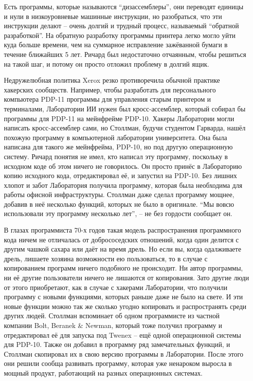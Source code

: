 Есть программы, которые называются ``дизассемблеры'', они переводят единицы и нули в низкоуровневые машинные инструкции, но разобраться, что эти инструкции делают -- очень долгий и трудный процесс, называемый ``обратной разработкой''. На обратную разработку программы принтера легко могло уйти куда больше времени, чем на суммарное исправление зажёванной бумаги в течение ближайших 5 лет. Ричард был недостаточно отчаянным, чтобы решиться на такой шаг, и потому он просто отложил проблему в долгий ящик.

Недружелюбная политика Xerox резко противоречила обычной практике хакерских сообществ. Например, чтобы разработать для персонального компьютера PDP-11 программы для управления старым принтером и терминалами, Лаборатории ИИ нужен был кросс-ассемблер, который собирал бы программы для PDP-11 на мейнфрейме PDP-10. Хакеры Лаборатории могли написать кросс-ассемблер сами, но Столлман, будучи студентом Гарварда, нашёл похожую программу в компьютерной лаборатории университета. Она была написана для такого же мейнфрейма, PDP-10, но под другую операционную систему. Ричард понятия не имел, кто написал эту программу, поскольку в исходном коде об этом ничего не говорилось. Он просто принёс в Лабораторию копию исходного кода, отредактировал её, и запустил на PDP-10. Без лишних хлопот и забот Лаборатория получила программу, которая была необходима для работы офисной инфраструктуры. Столлман даже сделал программу мощнее, добавив в неё несколько функций, которых не было в оригинале. ``Мы вовсю использовали эту программу несколько лет'', -- не без гордости сообщает он.

В глазах программиста 70-х годов такая модель распространения программного кода ничем не отличалась от добрососедских отношений, когда один делится с другим чашкой сахара или даёт на время дрель. Но если вы, когда одалживаете дрель, лишаете хозяина возможности ею пользоваться, то в случае с копированием программ ничего подобного не происходит. Ни автор программы, ни её другие пользователи ничего не лишаются от копирования. Зато другие люди от этого приобретают, как в случае с хакерами Лаборатории, что получили программу с новыми функциями, которых раньше даже не было на свете. И эти новые функции можно так же сколько угодно копировать и распространять среди других людей. Столлман вспоминает об одном программисте из частной компании Bolt, Beranek \& Newman, который тоже получил программу и отредактировал её для запуска под Twenex -- ещё одной операционной системы для PDP-10. Также он добавил в программу ряд замечательных функций, и Столлман скопировал их в свою версию программы в Лаборатории. После этого они решили сообща развивать программу, которая уже ненароком выросла в мощный продукт, работающий на разных операционных системах.

